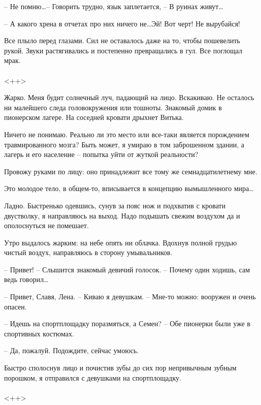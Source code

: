 \documentclass[a4paper]{book}
\begin{document}
-- Не помню\ldots -- Говорить трудно, язык заплетается, -- В руинах живут\ldots 

-- А какого хрена в отчетах про них ничего не\ldots Эй! Вот черт! Не вырубайся! 

Все плыло перед глазами. Сил не оставалось даже на то, чтобы пошевелить рукой. Звуки растягивались и постепенно превращались в гул. Все поглощал мрак.

\paragraph{}<++>

Жарко. Меня будит солнечный луч, падающий на лицо. Вскакиваю. Не осталось ни малейшего следа головокружения или тошноты. Знакомый домик в пионерском лагере. На соседней кровати дрыхнет Витька. 

Ничего не понимаю. Реально ли это место или все-таки является порождением травмированного мозга? Быть может, я умираю в том заброшенном здании, а лагерь и его население -- попытка уйти от жуткой реальности? 

Провожу руками по лицу: оно принадлежит все тому же семнадцатилетнему мне. 

Это молодое тело, в общем-то, вписывается в концепцию вымышленного мира\ldots 

Ладно. Быстренько одевшись, сунув за пояс нож и подхватив с кровати двустволку, я направляюсь на выход. Надо подышать свежим воздухом да и ополоснуться не помешает. 

Утро выдалось жарким: на небе опять ни облачка. Вдохнув полной грудью чистый воздух, направляюсь в сторону умывальников. 

-- Привет! -- Слышится знакомый девичий голосок. -- Почему один ходишь, сам ведь говорил\ldots

-- Привет, Славя, Лена. -- Киваю я девушкам. -- Мне-то можно: вооружен и очень опасен.

-- Идешь на спортплощадку поразмяться, а Семен? -- Обе пионерки были уже в спортивных костюмах.

-- Да, пожалуй. Подождите, сейчас умоюсь.

Быстро сполоснув лицо и почистив зубы до сих пор непривычным зубным порошком, я отправился с девушками на спортплощадку. 

\paragraph{}<++>
\end{document}
